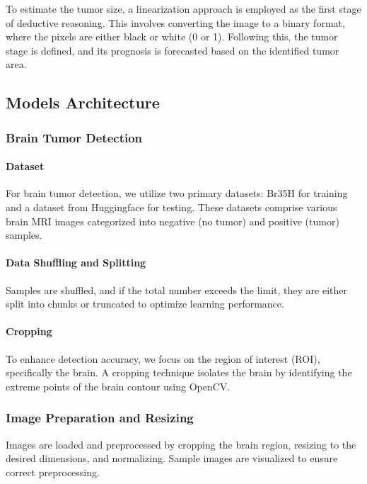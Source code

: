 \documentclass[conference]{IEEEtran}
\begin{document}
To estimate the tumor size, a linearization approach is employed as the first stage of deductive reasoning. 
This involves converting the image to a binary format, where the pixels are either black or white (0 or 1). 
Following this, the tumor stage is defined, and its prognosis is forecasted based on the identified tumor area.

\subsection{Models Architecture}

\subsubsection{Brain Tumor Detection}

\paragraph{Dataset}

For brain tumor detection, we utilize two primary datasets: Br35H \cite{br35h} for training and a dataset from Huggingface \cite{huggingface_data} for testing. 
These datasets comprise various brain MRI images categorized into negative (no tumor) and positive (tumor) samples.

\paragraph{Data Shuffling and Splitting}

Samples are shuffled, and if the total number exceeds the limit, they are either split into chunks or truncated to optimize learning performance.

\paragraph{Cropping}
To enhance detection accuracy, we focus on the region of interest (ROI), specifically the brain. 
A cropping technique isolates the brain by identifying the extreme points of the brain contour using OpenCV.

\subsubsection{Image Preparation and Resizing}
Images are loaded and preprocessed by cropping the brain region, resizing to the desired dimensions, and normalizing. 
Sample images are visualized to ensure correct preprocessing.
\end{document}
